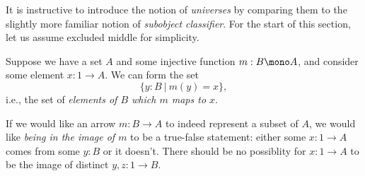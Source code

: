 \begin{node}
%
It is instructive to introduce the notion of \emph{universes} by
comparing them to the slightly more familiar notion of \emph{subobject
classifier}. For the start of this section, let us assume excluded
middle for simplicity.
%
\end{node}

\begin{node}
%
Suppose we have a set \(A\) and some injective function \(m : B \mono
A\), and consider some element \(x : 1 \to A\). We can
form the set
\[
  \{ y : B\ |\ m(y) = x \},
\]
i.e., the set of \emph{elements of \(B\) which \(m\) maps to \(x\)}.
%
\end{node}

\begin{node}
%
If we would like an arrow \(m : B \to A\) to indeed represent a subset
of \(A\), we would like \emph{being in the image of \(m\)} to be a
true-false statement: either some \(x : 1 \to A\) comes from some \(y :
B\) or it doesn't. There should be no possiblity for \(x : 1 \to A\) to
be the image of distinct \(y, z : 1 \to B\).
%
\end{node}




